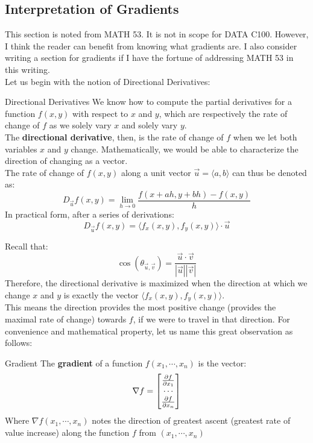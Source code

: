 \subsection{Interpretation of Gradients}
This section is noted from MATH 53. It is not in scope for DATA C100. However, I think the reader can benefit from knowing what gradients are. I also consider writing a section for gradients if I have the fortune of addressing MATH 53 in this writing. \\
Let us begin with the notion of Directional Derivatives:
\begin{ln-define}{Directional Derivatives}{}
    We know how to compute the partial derivatives for a function $f(x, y)$ with respect to $x$ and $y$, which are respectively the rate of change of $f$ as we solely vary $x$ and solely vary $y$. \\
    The \textbf{directional derivative}, then, is the rate of change of $f$ when we let both variables $x$ and $y$ change. Mathematically, we would be able to characterize the direction of changing as a vector. \\
    The rate of change of $f(x, y)$ along a unit vector $\vec{u} = \langle a, b \rangle$ can thus be denoted as:
    \[D_{\vec{u}}f(x, y) = \lim_{h \rightarrow 0} \frac{f(x + ah, y + bh) - f(x, y)}{h}\]
    In practical form, after a series of derivations:
    \[D_{\vec{u}}f(x, y) = \langle f_x (x, y), f_y (x, y) \rangle \cdot \vec{u}\]
\end{ln-define}
Recall that:
\[\cos(\theta_{\vec{u}, \vec{v}}) = \frac{\vec{u} \cdot \vec{v}}{|\vec{u}| |\vec{v}|}\]
Therefore, the directional derivative is maximized when the direction at which we change $x$ and $y$ is exactly the vector $\langle f_x (x, y), f_y (x, y) \rangle$. \\
This means the direction provides the most positive change (provides the maximal rate of change) towards $f$, if we were to travel in that direction. For convenience and mathematical property, let us name this great observation as follows:
\begin{ln-define}{Gradient}{}
    The \textbf{gradient} of a function $f(x_1, \cdots, x_n)$ is the vector:
    \[\nabla f = \begin{bmatrix} \pdv{f}{x_1} \\ \cdots \\ \pdv{f}{x_n} \end{bmatrix}\]
    Where $\nabla f(x_1, \cdots, x_n)$ notes the direction of greatest ascent (greatest rate of value increase) along the function $f$ from $(x_1, \cdots, x_n)$
\end{ln-define}
